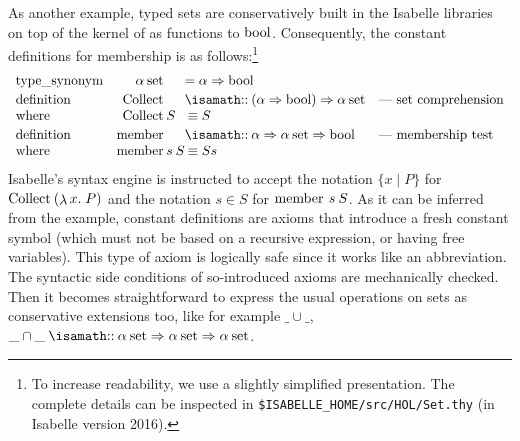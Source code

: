 As another example, typed sets are conservatively built in the
Isabelle libraries on top of the kernel of \HOL as functions to
$\mathrm{bool}$. Consequently, the constant definitions for membership
is as follows:\footnote{To increase readability, we use a slightly
  simplified presentation. The complete details can be inspected in
  \texttt{\$ISABELLE\_HOME/src/HOL/Set.thy} (in Isabelle version
  2016).}
\begin{gather*}
  \begin{array}{lr@{}l@{}ll}
    \typesynonym& \HolSet{\alpha}            &&= \alpha \Rightarrow \HolBoolean\\[.5ex]
    \isardef &\operatorname{Collect}&&\ofType \ap (\alpha \Rightarrow \HolBoolean) \Rightarrow \HolSet{\alpha}  &\text{--- set comprehension}\\
     \where &\operatorname{Collect} & \ap S      & \ap \equiv S\\[.5ex]
     \isardef &\operatorname{member}           &&\ofType \ap \alpha \Rightarrow \HolSet{\alpha} \Rightarrow \HolBoolean &\text{--- membership test}\\
     \where &\operatorname{member} & \ap s\ap S &\ap \equiv S s
  \end{array}
\end{gather*}
Isabelle's syntax engine is instructed to accept the notation $\{x
\mid P\}$ for $\operatorname{Collect}\ap(\lambda x\spot P)$ and the
notation $s \in S$ for $\operatorname{member}\: s\: S$. As it can be
inferred from the example, constant definitions are axioms that
introduce a fresh constant symbol (which must not be based on a
recursive expression, or having free variables). This type of axiom is
logically safe since it works like an abbreviation. The syntactic side
conditions of so-introduced axioms are mechanically checked. Then it
becomes straightforward to express the usual operations on sets as
conservative extensions too, like for example $\_ \cup \_$,
$\_\cap\_\ofType\HolSet{\alpha} \Rightarrow \HolSet{\alpha}
\Rightarrow \HolSet{\alpha}$.

